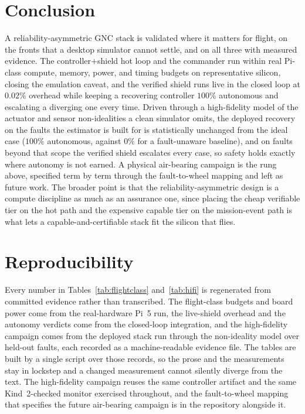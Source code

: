 \documentclass[journal]{IEEEtran}
\begin{document}
\section{Conclusion}
A reliability-asymmetric GNC stack is validated where it matters for flight, on the fronts that a
desktop simulator cannot settle, and on all three with measured evidence. The controller$+$shield
hot loop and the commander run within real Pi-class compute, memory, power, and timing budgets on
representative silicon, closing the emulation caveat, and the verified shield runs live in the
closed loop at $0.02\%$ overhead while keeping a recovering controller $100\%$ autonomous and
escalating a diverging one every time. Driven through a high-fidelity model of the actuator and
sensor non-idealities a clean simulator omits, the deployed recovery on the faults the estimator is
built for is statistically unchanged from the ideal case ($100\%$ autonomous, against $0\%$ for a
fault-unaware baseline), and on faults beyond that scope the verified shield escalates every case,
so safety holds exactly where autonomy is not earned. A physical air-bearing campaign is the rung
above, specified term by term through the fault-to-wheel mapping and left as future work. The
broader point is that the reliability-asymmetric design is a compute discipline as much as an
assurance one, since placing the cheap verifiable tier on the hot path and the expensive capable
tier on the mission-event path is what lets a capable-and-certifiable stack fit the silicon that
flies.

\section{Reproducibility}
Every number in Tables~\ref{tab:flightclass} and~\ref{tab:hifi} is regenerated from committed
evidence rather than transcribed. The flight-class budgets and board power come from the
real-hardware Pi~5 run, the live-shield overhead and the autonomy verdicts come from the
closed-loop integration, and the high-fidelity campaign comes from the deployed stack run through
the non-ideality model over held-out faults, each recorded as a machine-readable evidence file. The
tables are built by a single script over those records, so the prose and the measurements stay in
lockstep and a changed measurement cannot silently diverge from the text. The high-fidelity
campaign reuses the same controller artifact and the same Kind~2-checked monitor exercised
throughout, and the fault-to-wheel mapping that specifies the future air-bearing campaign is in the
repository alongside it.
\end{document}

